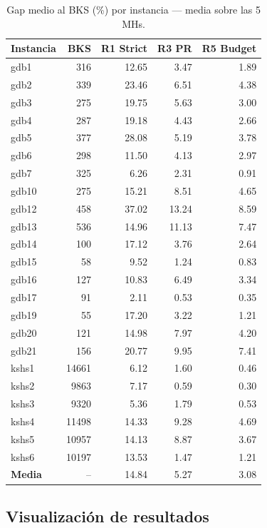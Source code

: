 \begin{table}[h]
\centering
\caption{Gap medio al BKS (\%) por instancia — media sobre las 5 MHs.}
\label{tab:re-greedy-inst}
\small
\begin{tabular}{lrrrr}
\toprule
Instancia & BKS & R1 Strict & R3 PR & R5 Budget \\
\midrule
gdb1  &  316 & 12.65 & 3.47 & 1.89 \\
gdb2  &  339 & 23.46 & 6.51 & 4.38 \\
gdb3  &  275 & 19.75 & 5.63 & 3.00 \\
gdb4  &  287 & 19.18 & 4.43 & 2.66 \\
gdb5  &  377 & 28.08 & 5.19 & 3.78 \\
gdb6  &  298 & 11.50 & 4.13 & 2.97 \\
gdb7  &  325 &  6.26 & 2.31 & 0.91 \\
gdb10 &  275 & 15.21 & 8.51 & 4.65 \\
gdb12 &  458 & 37.02 & 13.24 & 8.59 \\
gdb13 &  536 & 14.96 & 11.13 & 7.47 \\
gdb14 &  100 & 17.12 & 3.76 & 2.64 \\
gdb15 &   58 &  9.52 & 1.24 & 0.83 \\
gdb16 &  127 & 10.83 & 6.49 & 3.34 \\
gdb17 &   91 &  2.11 & 0.53 & 0.35 \\
gdb19 &   55 & 17.20 & 3.22 & 1.21 \\
gdb20 &  121 & 14.98 & 7.97 & 4.20 \\
gdb21 &  156 & 20.77 & 9.95 & 7.41 \\
kshs1 & 14661 & 6.12 & 1.60 & 0.46 \\
kshs2 &  9863 & 7.17 & 0.59 & 0.30 \\
kshs3 &  9320 & 5.36 & 1.79 & 0.53 \\
kshs4 & 11498 & 14.33 & 9.28 & 4.69 \\
kshs5 & 10957 & 14.13 & 8.87 & 3.67 \\
kshs6 & 10197 & 13.53 & 1.47 & 1.21 \\
\midrule
\textbf{Media} & -- & 14.84 & 5.27 & 3.08 \\
\bottomrule
\end{tabular}
\end{table}

\subsection{Visualización de resultados}
\label{subsec:viz-re-greedy}

